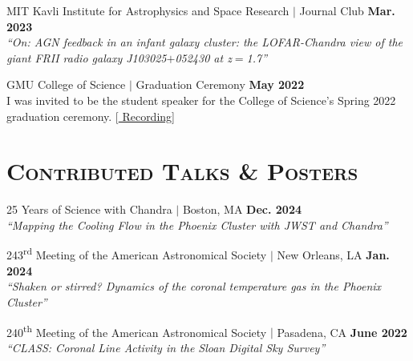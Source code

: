 \documentclass[marg, centered]{res}
\begin{document}
\begin{resume}
\begin{etaremune}[itemindent=0pt, leftmargin=19pt]
    
\item MIT Kavli Institute for Astrophysics and Space Research $|$ Journal Club \hfill \textbf{Mar. 2023} \\
\textit{``On: AGN feedback in an infant galaxy cluster: the LOFAR-Chandra view of the giant FRII radio galaxy J103025$+$052430 at z$=$1.7''}

\item GMU College of Science $|$ Graduation Ceremony \hfill \textbf{May 2022} \\
{I was invited to be the student speaker for the College of Science's Spring 2022 graduation ceremony.} {[\href{https://www.youtube.com/watch?v=xsyi9sqYH4o}{\color{dkbu} Recording}]}

\end{etaremune}

\section{{\scshape \bfseries Contributed Talks \& Posters}}

\begin{etaremune}[itemindent=0pt, leftmargin=19pt]

\item 25 Years of Science with Chandra $|$ Boston, MA \hfill \textbf{Dec. 2024} \\
{} 
\textit{``Mapping the Cooling Flow in the Phoenix Cluster with JWST and Chandra''} 

\item 243\textsuperscript{rd} Meeting of the American Astronomical Society $|$ New Orleans, LA \hfill \textbf{Jan. 2024} \\
{} 
\textit{``Shaken or stirred? Dynamics of the coronal temperature gas in the Phoenix Cluster''} 
    
\item 240\textsuperscript{th} Meeting of the American Astronomical Society $|$ Pasadena, CA \hfill \textbf{June 2022} \\
{} 
\textit{``CLASS: Coronal Line Activity in the Sloan Digital Sky Survey''}


\end{etaremune}
\end{resume}
\end{document}
